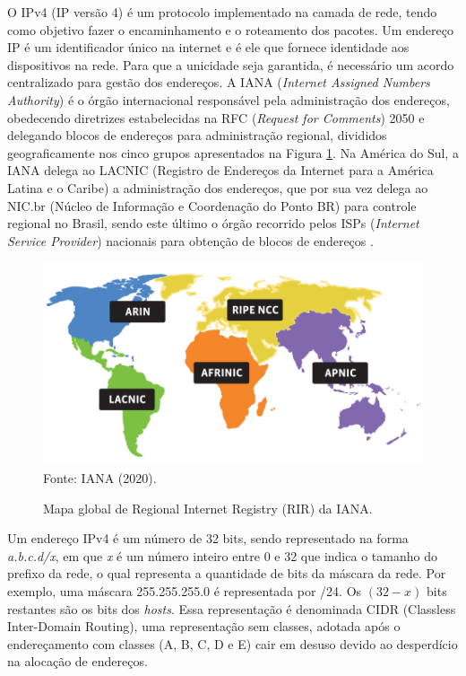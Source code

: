     O IPv4 (IP versão 4) é um protocolo implementado na camada de rede, tendo como objetivo fazer o encaminhamento e o roteamento dos pacotes. Um endereço IP é um identificador único na internet e é ele que fornece identidade aos dispositivos na rede. Para que a unicidade seja garantida, é necessário um acordo centralizado para gestão dos endereços. A IANA (\textit{Internet Assigned Numbers Authority}) é o órgão internacional responsável pela administração dos endereços, obedecendo diretrizes estabelecidas na RFC (\textit{Request for Comments}) 2050 e delegando blocos de endereços para administração regional, divididos geograficamente nos cinco grupos apresentados na Figura \ref{fig:rir_map}. Na América do Sul, a IANA delega ao LACNIC (Registro de Endereços da Internet para a América Latina e o Caribe) a administração dos endereços, que por sua vez delega ao NIC.br (Núcleo de Informação e Coordenação do Ponto BR) para controle regional no Brasil, sendo este último o órgão recorrido pelos ISPs (\textit{Internet Service Provider}) nacionais para obtenção de blocos de endereços \cite{iana2020}.
    
    \begin{figure}[!htb]
        \centering
        \caption{Mapa global de Regional Internet Registry (RIR) da IANA.} 
        \label{fig:rir_map} 
        \includegraphics[scale=1.5]{img/rir-map.png} \\
        {\small Fonte: IANA (2020).} 
    \end{figure}
    

    Um endereço IPv4 é um número de 32 bits, sendo representado na forma \textit{a.b.c.d/x}, em que \textit{x} é um número inteiro entre 0 e 32 que indica o tamanho do prefixo da rede, o qual representa a quantidade de bits da máscara da rede. Por exemplo, uma máscara 255.255.255.0 é representada por /24. Os $(32 - x)$ bits restantes são os bits dos \textit{hosts}. Essa representação é denominada CIDR (Classless Inter-Domain Routing), uma representação sem classes, adotada após o endereçamento com classes (A, B, C, D e E) cair em desuso devido ao desperdício na alocação de endereços.
    
